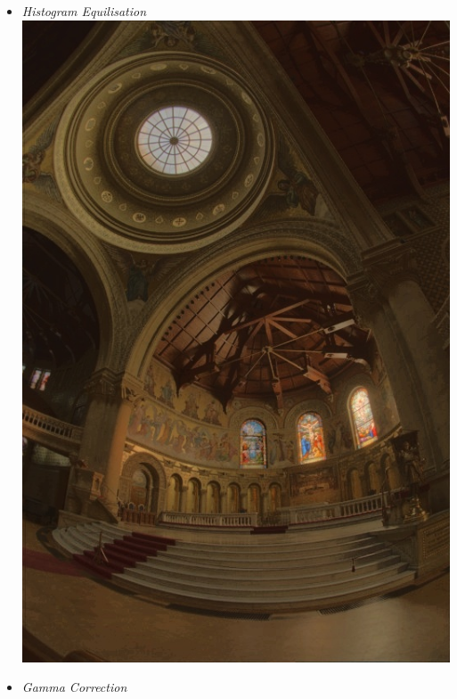 \documentclass{article}
\begin{document}
    \begin{itemize}
        \item \textit{Histogram Equilisation} \\
        \includegraphics[scale=.25]{./data/2/lg/s1.jpg}
        \item \textit{Gamma Correction}\\

\end{itemize}
\end{document}
